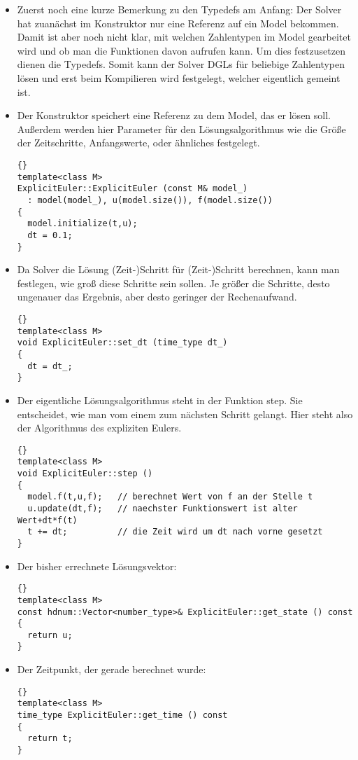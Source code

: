 \documentclass[a4paper,11pt]{article}
\theoremstyle{definition}
\begin{document}
\begin{itemize}
\item Zuerst noch eine kurze Bemerkung zu den Typedefs am Anfang: Der
  Solver hat zuanächst im Konstruktor nur eine Referenz auf ein Model
  bekommen. Damit ist aber noch nicht klar, mit welchen Zahlentypen im
  Model gearbeitet wird und ob man die Funktionen davon aufrufen
  kann. Um dies festzusetzen dienen die Typedefs. Somit kann der
  Solver DGLs für beliebige Zahlentypen lösen und erst beim
  Kompilieren wird festgelegt, welcher eigentlich gemeint ist.

\item Der Konstruktor speichert eine Referenz zu dem Model, das er
  lösen soll. Außerdem werden hier Parameter für den
  Lösungsalgorithmus wie die Größe der Zeitschritte, Anfangswerte,
  oder ähnliches festgelegt.

{\footnotesize{\begin{lstlisting}{}
template<class M>
ExplicitEuler::ExplicitEuler (const M& model_)
  : model(model_), u(model.size()), f(model.size())
{
  model.initialize(t,u);
  dt = 0.1;
}
\end{lstlisting}}}

\item Da Solver die Lösung (Zeit-)Schritt für (Zeit-)Schritt
  berechnen, kann man festlegen, wie groß diese Schritte sein
  sollen. Je größer die Schritte, desto ungenauer das Ergebnis, aber
  desto geringer der Rechenaufwand.

{\footnotesize{\begin{lstlisting}{}
template<class M>
void ExplicitEuler::set_dt (time_type dt_)
{
  dt = dt_;
}
\end{lstlisting}}}

\item Der eigentliche Lösungsalgorithmus steht in der Funktion
  step. Sie entscheidet, wie man vom einem zum nächsten Schritt
  gelangt. Hier steht also der Algorithmus des expliziten Eulers.

{\footnotesize{\begin{lstlisting}{}
template<class M>
void ExplicitEuler::step ()
{
  model.f(t,u,f);   // berechnet Wert von f an der Stelle t
  u.update(dt,f);   // naechster Funktionswert ist alter Wert+dt*f(t)
  t += dt;          // die Zeit wird um dt nach vorne gesetzt
}
\end{lstlisting}}}

\item Der bisher errechnete Lösungsvektor:
{\footnotesize{\begin{lstlisting}{}
template<class M>
const hdnum::Vector<number_type>& ExplicitEuler::get_state () const
{
  return u;
}
\end{lstlisting}}}
\item Der Zeitpunkt, der gerade berechnet wurde:
{\footnotesize{\begin{lstlisting}{}
template<class M>
time_type ExplicitEuler::get_time () const
{
  return t;
}
\end{lstlisting}}}


\end{itemize}
\end{document}

